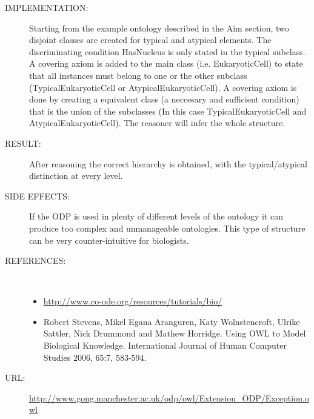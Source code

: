 \begin{description}
\item [IMPLEMENTATION:] Starting from the example ontology described in the Aim section, two disjoint classes are created for typical and atypical elements. The discriminating condition HasNucleus is only stated in the typical subclass. A covering axiom is added to the main class (i.e. EukaryoticCell) to state that all instances must belong to one or the other subclass (TypicalEukaryoticCell or AtypicalEukaryoticCell). A covering axiom is done by creating a equivalent class (a neccesary and sufficient condition) that is the union of the subclasses (In this case TypicalEukaryoticCell and AtypicalEukaryoticCell). The reasoner will infer the whole structure.

\item [RESULT:] After reasoning the correct hierarchy is obtained, with the typical/atypical distinction at every level.

\item [SIDE EFFECTS:] If the ODP is used in plenty of different levels of the ontology it can produce too complex and unmanageable ontologies. This type of structure can be very counter-intuitive for biologists.

\item [REFERENCES: ] ~\begin{itemize}
\item \url{http://www.co-ode.org/resources/tutorials/bio/}
\item Robert Stevens, Mikel Egana Aranguren, Katy Wolnstencroft, Ulrike Sattler, Nick Drummond and Mathew Horridge. Using OWL to Model Biological Knowledge. International Journal of Human Computer Studies 2006, 65:7, 583-594.\end{itemize}
\item [URL: ] \url{http://www.gong.manchester.ac.uk/odp/owl/Extension_ODP/Exception.owl} \end{description}